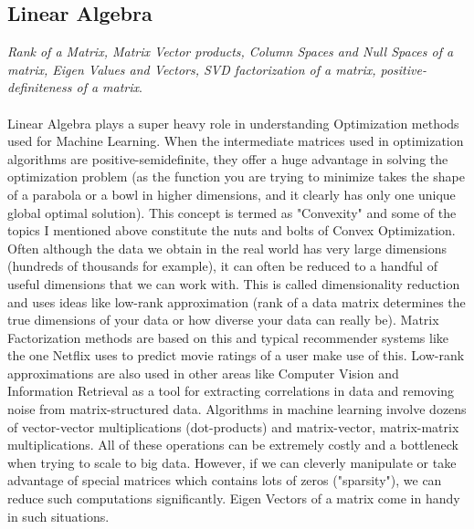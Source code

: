 \documentclass[a4paper]{article}
\begin{document}
\subsection{Linear Algebra}
\textit{Rank of a Matrix, Matrix Vector products, Column Spaces and Null Spaces of a matrix, Eigen Values and Vectors, SVD factorization of a matrix, positive-definiteness of a matrix}. \\ \\
Linear Algebra plays a super heavy role in understanding Optimization methods used for Machine Learning. When the intermediate matrices used in optimization algorithms are positive-semidefinite, they offer a huge advantage in solving the optimization problem (as the function you are trying to minimize takes the shape of a parabola or a bowl in higher dimensions, and it clearly has only one unique global optimal solution). This concept is termed as "Convexity" and some of the topics I mentioned above constitute the nuts and bolts of Convex Optimization. Often although the data we obtain in the real world has very large dimensions (hundreds of thousands for example), it can often be reduced to a handful of useful dimensions that we can work with. This is called dimensionality reduction and uses ideas like low-rank approximation (rank of a data matrix determines the true dimensions of your data or how diverse your data can really be). Matrix Factorization methods are based on this and typical recommender systems like the one Netflix uses to predict movie ratings of a user make use of this. Low-rank approximations are also used in other areas like Computer Vision and Information Retrieval as a tool for extracting correlations in data and removing noise from matrix-structured data. Algorithms in machine learning involve dozens of vector-vector multiplications (dot-products) and matrix-vector, matrix-matrix multiplications. All of these operations can be extremely costly and a bottleneck when trying to scale to big data. However, if we can cleverly manipulate or take advantage of special matrices which contains lots of zeros ("sparsity"), we can reduce such computations significantly. Eigen Vectors of a matrix come in handy in such situations.\\
\end{document}
